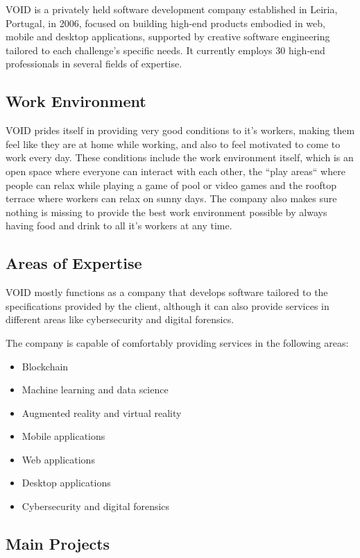 VOID is a privately held software development company established in Leiria, Portugal, in 2006, focused on building high-end products embodied in web, 
mobile and desktop applications, supported by creative software engineering tailored to each challenge's specific needs. 
It currently employs 30 high-end professionals in several fields of expertise.

\subsection{Work Environment}

VOID prides itself in providing very good conditions to it's workers, making them feel like they are at home while working,
and also to feel motivated to come to work every day. These conditions include the work environment itself, which is an open space where 
everyone can interact with each other, the ``play areas`` where people can relax while playing a game of pool or video games and the rooftop terrace where workers can relax on sunny days.
The company also makes sure nothing is missing to provide the best work environment possible by always having food and drink to all it's workers at any time.

\subsection{Areas of Expertise}

VOID mostly functions as a company that develops software tailored to the specifications provided by the client, although 
it can also provide services in different areas like cybersecurity and digital forensics.

The company is capable of comfortably providing services in the following areas:
\begin{itemize}
 \item Blockchain
 \item Machine learning and data science
 \item Augmented reality and virtual reality
 \item Mobile applications
 \item Web applications
 \item Desktop applications
 \item Cybersecurity and digital forensics
\end{itemize}

\subsection{Main Projects}

